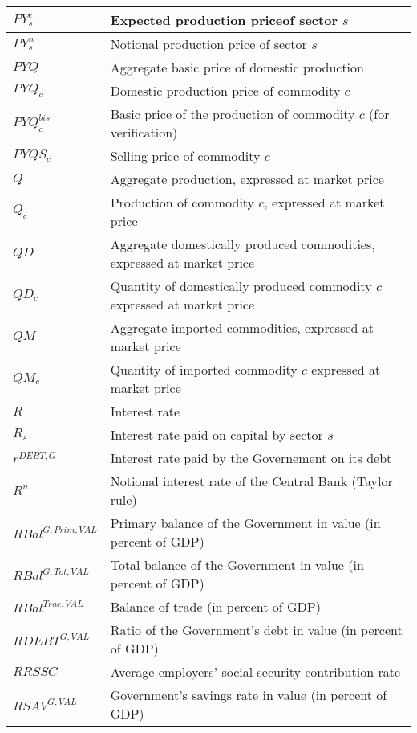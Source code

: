 \documentclass[12pt]{article}
\numberwithin{equation}{section}
\begin{document}
\begin{longtable}{@{}p{4cm}p{9cm}@{}}
 \midrule 
$PY^{e}_{s}$ & Expected production priceof sector $s$ \\
 \midrule 
$PY^{n}_{s}$ & Notional production price of sector $s$ \\
 \midrule 
$PYQ$ & Aggregate basic price of domestic production \\
 \midrule 
$PYQ_{c}$ & Domestic production price of commodity $c$ \\
 \midrule 
$PYQ^{bis}_{c}$ & Basic price of the production of commodity $c$ (for verification) \\
 \midrule 
$PYQS_{c}$ & Selling price of commodity $c$ \\
 \midrule 
$Q$ & Aggregate production, expressed at market price \\
 \midrule 
$Q_{c}$ & Production of commodity $c$, expressed at market price \\
 \midrule 
$QD$ & Aggregate domestically produced commodities, expressed at market price \\
 \midrule 
$QD_{c}$ & Quantity of domestically produced commodity $c$ expressed at market price \\
 \midrule 
$QM$ & Aggregate imported commodities, expressed at market price \\
 \midrule 
$QM_{c}$ & Quantity of imported commodity $c$ expressed at market price \\
 \midrule 
$R$ & Interest rate \\
 \midrule 
$R_{s}$ & Interest rate paid on capital by sector $s$ \\
 \midrule 
$r^{DEBT,G}$ & Interest rate paid by the Governement on its debt \\
 \midrule 
$R^{n}$ & Notional interest rate of the Central Bank (Taylor rule) \\
 \midrule 
$RBal^{G,Prim,VAL}$ & Primary balance of the Government in value (in percent of GDP) \\
 \midrule 
$RBal^{G,Tot,VAL}$ & Total balance of the Government in value (in percent of GDP) \\
 \midrule 
$RBal^{Trae,VAL}$ & Balance of trade (in percent of GDP) \\
 \midrule 
$RDEBT^{G,VAL}$ & Ratio of the Government's debt in value (in percent of GDP) \\
 \midrule 
$RRSSC$ & Average employers' social security contribution rate \\
 \midrule 
$RSAV^{G,VAL}$ & Government's savings rate in value (in percent of GDP) \\
 \midrule 

\end{longtable}
\end{document}
